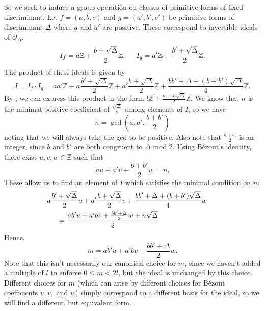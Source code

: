 \documentclass[honours,12pt]{unswthesis}
\newcommand{\Z}{\mathbb{Z}} %
\newcommand{\order}{\mathcal{O}} %
\numberwithin{equation}{section}
\begin{document}
So we seek to induce a group operation on classes of primitive forms of fixed discriminant.
Let $f = (a, b, c)$ and $g = (a', b', c')$ be primitive forms of discriminant $\Delta$ where $a$ and $a'$ are positive.
These correspond to invertible ideals of $\order_\Delta$:
$$I_f = a\Z + \frac{b + \sqrt\Delta}{2}\Z, \hspace{5mm} I_g = a'\Z + \frac{b' + \sqrt\Delta}{2}\Z.$$
The product of these ideals is given by
$$I = I_f \cdot I_g = aa'\Z + a\frac{b' + \sqrt\Delta}{2}\Z + a'\frac{b + \sqrt\Delta}{2}\Z + \frac{bb' + \Delta + (b + b')\sqrt\Delta}{4}\Z.$$
By , we can express this product in the form $l\Z + \frac{m + n\sqrt\Delta}{2}\Z$. 
We know that $n$ is the minimal positive coefficient of $\frac{\sqrt\Delta}{2}$ among elements of $I$, so we have
$$n = \gcd\left(a, a', \frac{b+b'}{2}\right)$$
noting that we will always take the gcd to be positive. 
Also note that $\frac{b + b'}{2}$ is an integer, since $b$ and $b'$ are both congruent to $\Delta$ mod 2.
Using B\'ezout's identity, there exist $u, v, w \in \Z$ such that
$$au + a'v + \frac{b+b'}{2}w = n.$$
These allow us to find an element of $I$ which satisfies the minimal condition on $n$:
\begin{align*}
    &\hspace{-5mm} a\frac{b' + \sqrt\Delta}{2}u + a'\frac{b + \sqrt\Delta}{2}v + \frac{bb' + \Delta + (b + b')\sqrt\Delta}{4}w \\
    &= \frac{ab'u + a'bv + \frac{bb' + \Delta}{2}w + n\sqrt\Delta}{2}
\end{align*}
Hence,
$$m = ab'u + a'bv + \frac{bb' + \Delta}{2}w.$$
Note that this isn't necessarily our canonical choice for $m$, since we haven't added a multiple of $l$ to enforce $0 \leq m < 2l$, but the ideal is unchanged by this choice.
Different choices for $m$ (which can arise by different choices for B\'ezout coefficients $u, v,$ and $w$) simply correspond to a different basis for the ideal, so we will find a different, but equivalent form.
\end{document}
